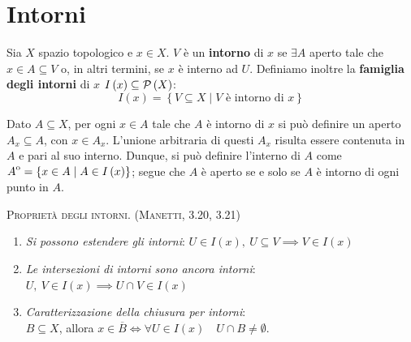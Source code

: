\section{Intorni}
\begin{define}
Sia $X$ spazio topologico e $x\in X$. $V$ è un \textbf{intorno} di $x$ se $\exists A$ aperto tale che $x\in A\subseteq V$ o, in altri termini, se $x$ è interno ad $U$.
Definiamo inoltre la \textbf{famiglia degli intorni} di $x$ $I\left(x\right)\subseteq\mathcal{P}\left(X\right)$:
\begin{equation}
I\left(x\right)=\left\{V\subseteq X\mid V\text{ è intorno di }x \right\}
\end{equation}
\end{define}
\begin{observe}
	Dato $A\subseteq X$, per ogni $x\in A$ tale che $A$ è intorno di $x$ si può definire un aperto $A_x\subseteq A$, con $x\in A_x$. L'unione arbitraria di questi $A_x$ risulta essere contenuta in $A$ e pari al suo interno. Dunque, si può definire l'interno di $A$ come ${\kern0ptA}^{\mathrm{o}}=\left\{x\in A\mid A\in I\left(x\right)\right\}$; segue che $A$ è aperto se e solo se $A$ è intorno di ogni punto in $A$.
\end{observe}
\begin{lemming}\textsc{Proprietà degli intorni. (Manetti, 3.20, 3.21)}
\begin{enumerate}
\item \textit{Si possono estendere gli intorni}: $U\in I\left(x\right),\ U\subseteq V\implies V\in I\left(x\right)$
\item \textit{Le intersezioni di intorni sono ancora intorni}: $U,\ V\in I\left(x\right)\implies U\cap V\in I\left(x\right)$
\item \textit{Caratterizzazione della chiusura per intorni}:\\$B\subseteq X$, allora $x\in\overline{B}\iff\forall U\in I\left(x\right)\quad U\cap B\neq \emptyset$.
\end{enumerate}
\end{lemming}
